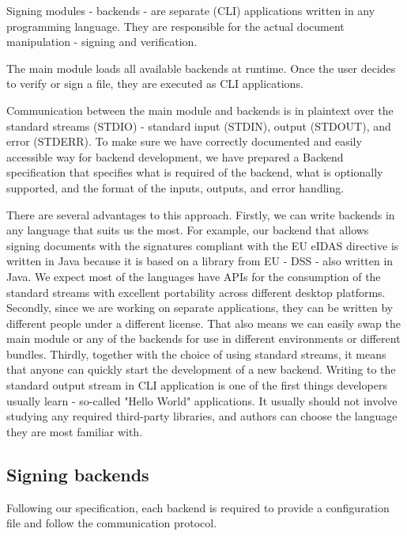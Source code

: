\documentclass[thesismargins, english, thesislinespacing, onelinechapterstyle, upjsfrontpage]{rnthesis}
\begin{document}
Signing modules - backends - are separate  (CLI) applications written in any programming language.
They are responsible for the actual document manipulation - signing and verification.

The main module loads all available backends at runtime.
Once the user decides to verify or sign a file, they are executed as CLI applications.

Communication between the main module and backends is in plaintext over the standard streams (STDIO) - standard input (STDIN), output (STDOUT), and error (STDERR).
To make sure we have correctly documented and easily accessible way for backend development, we have prepared a Backend specification that specifies what is required of the backend, what is optionally supported, and the format of the inputs, outputs, and error handling.


There are several advantages to this approach.
Firstly, we can write backends in any language that suits us the most.
For example, our backend that allows signing documents with the signatures compliant with the EU eIDAS directive is written in Java because it is based on a library from EU - DSS - also written in Java.
We expect most of the languages have APIs for the consumption of the standard streams with excellent portability across different desktop platforms.
Secondly, since we are working on separate applications, they can be written by different people under a different license.
That also means we can easily swap the main module or any of the backends for use in different environments or different bundles.
Thirdly, together with the choice of using standard streams, it means that anyone can quickly start the development of a new backend.
Writing to the standard output stream in CLI application is one of the first things developers usually learn - so-called "Hello World" applications.
It usually should not involve studying any required third-party libraries, and authors can choose the language they are most familiar with.

\subsection{Signing backends} \label{backends}

Following our specification, each backend is required to provide a configuration file and follow the communication protocol.
\end{document}
